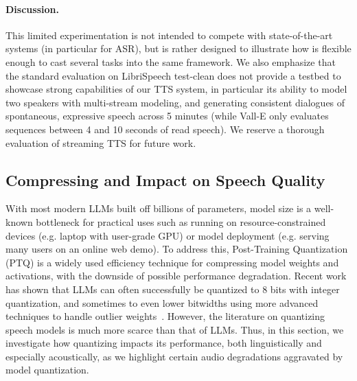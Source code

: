 \paragraph{Discussion.} This limited experimentation is not intended to compete with state-of-the-art systems (in particular for ASR), but is rather designed to illustrate how \interleaving{} is flexible enough to cast several tasks into the same framework. We also emphasize that the standard evaluation on LibriSpeech test-clean does not provide a testbed to showcase strong capabilities of our TTS system, in particular its ability to model two speakers with multi-stream modeling, and generating consistent dialogues of spontaneous, expressive speech across 5 minutes (while Vall-E only evaluates sequences between 4 and 10 seconds of read speech). We reserve a thorough evaluation of streaming TTS for future work.











\subsection{Compressing \ours{} and Impact on Speech Quality}

With most modern LLMs built off billions of parameters, model size is a well-known bottleneck for practical uses such as running on resource-constrained devices (e.g. laptop with user-grade GPU) or model deployment (e.g. serving many users on an online web demo). 
To address this, Post-Training Quantization (PTQ) is a widely used efficiency technique for compressing model weights and activations,  with the downside of possible performance degradation. Recent work has shown that LLMs can often successfully be quantized to 8 bits with integer quantization, and sometimes to even lower bitwidths using more advanced techniques to handle outlier weights~\citep{pmlr-v202-dettmers23a, llmint8,optq,quipsharp}.
However, the literature on quantizing speech models is much more scarce than that of LLMs. 
Thus, in this section, we investigate how quantizing \ours{} impacts its performance, both linguistically and especially acoustically,  as we  highlight certain audio degradations aggravated by model quantization.
